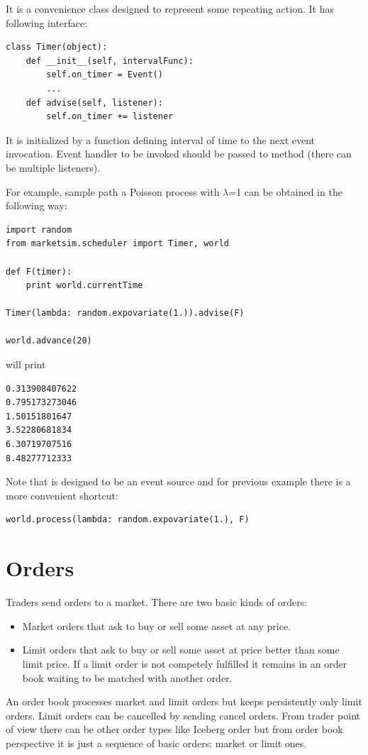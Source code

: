 \documentclass[a4paper,11pt]{article}
\newcommand{\tmtexttt}[1]{{\ttfamily{#1}}}
\begin{document}
It is a convenience class designed to represent some repeating action. It has following interface:

\begin{verbatim}
class Timer(object):
    def __init__(self, intervalFunc):
        self.on_timer = Event()
        ...
    def advise(self, listener):
        self.on_timer += listener
\end{verbatim}

It is initialized by a function defining interval of time to the next event invocation. Event handler to be invoked should be passed to \tmtexttt{advise} method (there can be multiple listeners).

For example, sample path a Poisson process with $\lambda$=1 can be obtained in the following way:
\begin{verbatim}
import random
from marketsim.scheduler import Timer, world

def F(timer):
    print world.currentTime
    
Timer(lambda: random.expovariate(1.)).advise(F)

world.advance(20)
\end{verbatim}

will print 

\begin{verbatim}
0.313908407622
0.795173273046
1.50151801647
3.52280681834
6.30719707516
8.48277712333
\end{verbatim}

Note that \tmtexttt{Timer} is designed to be an event source and for previous example there is a more convenient shortcut:

\begin{verbatim}
world.process(lambda: random.expovariate(1.), F)
\end{verbatim}

\section{Orders}

Traders send orders to a market. There are two basic kinds of orders: 
\begin{itemize}
\item Market orders that ask to buy or sell some asset at any price. 
\item Limit orders that ask to buy or sell some asset at price better than some limit price. If a limit order is not competely fulfilled it remains in an order book waiting to be matched with another order.
\end{itemize}
An order book processes market and limit orders but keeps persistently only limit orders. Limit orders can be cancelled by sending cancel orders.
From trader point of view there can be other order types like Iceberg order but from order book perspective it is just a sequence of basic orders: market or limit ones. 
\end{document}
